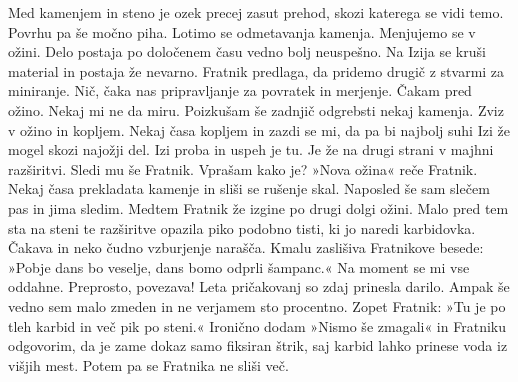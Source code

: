 Med kamenjem in steno je ozek precej zasut prehod, skozi katerega se vidi temo. Povrhu pa še močno piha. Lotimo se odmetavanja kamenja. Menjujemo se v ožini. Delo postaja po določenem času vedno bolj neuspešno. Na Izija se kruši material in postaja že nevarno. Fratnik predlaga, da pridemo drugič z stvarmi za miniranje. Nič, čaka nas pripravljanje za povratek in merjenje. Čakam pred ožino. Nekaj mi ne da miru. Poizkušam še zadnjič odgrebsti nekaj kamenja. Zviz v ožino in kopljem. Nekaj časa kopljem in zazdi se mi, da pa bi najbolj suhi Izi že mogel skozi najožji del. Izi proba in uspeh je tu. Je že na drugi strani v majhni razširitvi. Sledi mu še Fratnik. Vprašam kako je? »Nova ožina« reče Fratnik. Nekaj časa prekladata kamenje in sliši se rušenje skal. Naposled še sam slečem pas in jima sledim. Medtem Fratnik že izgine po drugi dolgi ožini. Malo pred tem sta na steni te razširitve opazila piko podobno tisti, ki jo naredi karbidovka. Čakava in neko čudno vzburjenje narašča. Kmalu zaslišiva Fratnikove besede: »Pobje dans bo veselje, dans bomo odprli šampanc.« Na moment se mi vse oddahne. Preprosto, povezava! Leta pričakovanj so zdaj prinesla darilo. Ampak še vedno sem malo zmeden in ne verjamem sto procentno. Zopet Fratnik: »Tu je po tleh karbid in več pik po steni.«  Ironično dodam »Nismo še zmagali« in Fratniku odgovorim, da je zame dokaz samo fiksiran štrik, saj karbid lahko prinese voda iz višjih mest. Potem pa se Fratnika ne sliši več. 

